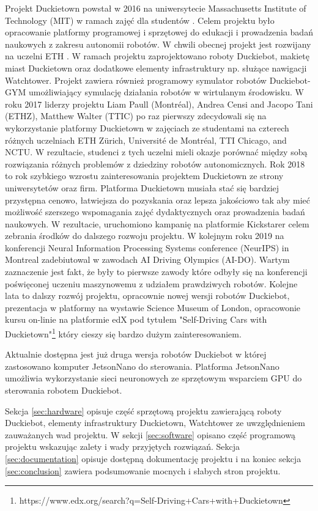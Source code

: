 \documentclass{svproc}
\begin{document}
Projekt Duckietown powstał w 2016 na uniwersytecie Massachusetts Institute of Technology (MIT) w ramach zajęć dla studentów \cite{paull2017duckietown}. Celem projektu było opracowanie platformy programowej i sprzętowej do edukacji i prowadzenia badań naukowych z zakresu autonomii robotów. W chwili obecnej projekt jest rozwijany na uczelni ETH . W ramach projektu zaprojektowano roboty Duckiebot, makietę miast Duckietown oraz dodatkowe elementy infrastruktury np. służące nawigacji Watchtower. Projekt zawiera również programowy symulator robotów Duckiebot-GYM umożliwiający symulację działania robotów w wirtulanym środowisku. 
W roku 2017 liderzy projektu Liam Paull (Montréal), Andrea Censi and Jacopo Tani (ETHZ), Matthew Walter (TTIC) po raz pierwszy zdecydowali się na wykorzystanie platformy Duckietown w zajęciach ze studentami na czterech różnych uczelniach ETH Zürich, Université de Montréal, TTI Chicago, and NCTU. W rezultacie, studenci z tych uczelni mieli okazje porównać między sobą rozwiązania różnych problemów z dziedziny robotów autonomicznych. Rok 2018 to rok szybkiego wzrostu zainteresowania projektem Duckietown ze strony uniwersytetów oraz firm. Platforma Duckietown musiała stać się bardziej przystępna cenowo, łatwiejsza do pozyskania oraz lepsza jakościowo tak aby mieć możliwość szerszego wspomagania zajęć dydaktycznych oraz prowadzenia badań naukowych. W rezultacie, uruchomiono kampanię na platformie Kickstarer celem zebrania środków do dalszego rozwoju projektu. W kolejnym roku 2019 na konferencji Neural Information Processing Systems conference (NeurIPS) in Montreal zadebiutowal w zawodach AI Driving Olympics (AI-DO). Wartym zaznaczenie jest fakt, że były to pierwsze zawody które odbyły się na konferencji poświęconej uczeniu maszynowemu z udziałem prawdziwych robotów. Kolejne lata to dalszy rozwój projektu, opracownie nowej wersji robotów Duckiebot, prezentacja w platformy na wystawie Science Museum of London, opracowonie kursu on-linie na platformie edX pod tytułem "Self-Driving Cars with Duckietown"\footnote{https://www.edx.org/search?q=Self-Driving+Cars+with+Duckietown} który cieszy się bardzo dużym zainteresowaniem.

Aktualnie dostępna jest już druga wersja robotów Duckiebot w której zastosowano komputer JetsonNano do sterowania. Platforma JetsonNano umożliwia wykorzystanie sieci neuronowych ze sprzętowym wsparciem GPU do sterowania robotem Duckiebot. 

Sekcja \ref{sec:hardware} opisuje część sprzętową projektu zawierającą roboty Duckiebot, elementy infrastruktury Duckietown, Watchtower ze uwzględnieniem zauważanych wad projektu. W sekcji \ref{sec:software} opisano część programową projektu wskazując zalety i wady przyjętych rozwiązań.
Sekcja \ref{sec:documentation} opisuje dostępną dokumentację projektu i na koniec sekcja \ref{sec:conclusion} zawiera podsumowanie mocnych i słabych stron projektu.
\end{document}
